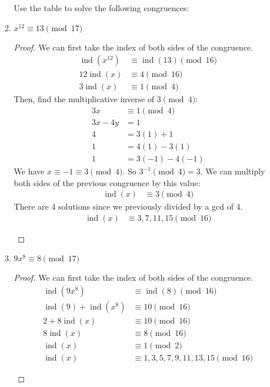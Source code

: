 \documentclass[11pt]{article}
\theoremstyle{definition}
\newcommand{\ind}{\operatorname{ind}}
\begin{document}
\begin{enumerate}
\begin{enumerate}
        Use the table to solve the following congruences:
        \item $x^{12}\equiv 13\pmod{17}$
        \begin{proof}
            We can first take the index of both sides of the congruence.
            \begin{align*}
                \ind(x^{12}) &\equiv \ind(13)\pmod{16} \\
                12\ind(x) &\equiv 4\pmod{16} \\
                3\ind(x) &\equiv 1\pmod{4}
            \end{align*}
            Then, find the multiplicative inverse of $3\pmod{4}$:
            \begin{align*}
                3x &\equiv 1\pmod{4} \\
                3x-4y &= 1 \\
                4 &= 3(1) + 1 \\
                1 &= 4(1)-3(1) \\
                1 &= 3(-1)-4(-1)
            \end{align*}
            We have $x\equiv -1\equiv 3\pmod{4}$. So $3^{-1}\pmod{4}=3$. 
            We can multiply both sides of the previous congruence by this value:
            \begin{align*}
                \ind(x) &\equiv 3\pmod{4}
            \end{align*}
            There are 4 solutions since we previously divided by a gcd of 4.
            \begin{align*}
                \ind(x) &\equiv 3,7,11,15 \pmod{16}
            \end{align*}
            \begin{center}
            \end{center}
        \end{proof}
        \item $9x^8\equiv 8\pmod{17}$
        \begin{proof}
            We can first take the index of both sides of the congruence.
            \begin{align*}
                \ind(9x^8) &\equiv \ind(8)\pmod{16} \\
                \ind(9) + \ind(x^8) &\equiv 10\pmod{16} \\
                2 + 8\ind(x) &\equiv 10\pmod{16} \\
                8\ind(x) &\equiv 8\pmod{16} \\
                \ind(x) &\equiv 1\pmod{2} \\
                \ind(x) &\equiv 1,3,5,7,9,11,13,15\pmod{16}
            \end{align*}\begin{center}
            \end{center}


\end{proof}
\end{enumerate}
\end{enumerate}
\end{document}
